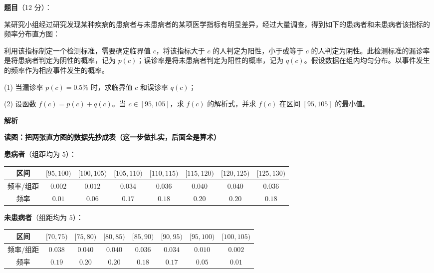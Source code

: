 \begin{answer}

\textbf{题目}（12 分）：

某研究小组经过研究发现某种疾病的患病者与未患病者的某项医学指标有明显差异，经过大量调查，得到如下的患病者和未患病者该指标的频率分布直方图：
\nopagebreak[4]
\begin{center}\end{center}
\nopagebreak[4]
利用该指标制定一个检测标准，需要确定临界值 $c$，将该指标大于 $c$ 的人判定为阳性，小于或等于 $c$ 的人判定为阴性。此检测标准的漏诊率是将患病者判定为阴性的概率，记为 $p(c)$；误诊率是将未患病者判定为阳性的概率，记为 $q(c)$。假设数据在组内均匀分布。以事件发生的频率作为相应事件发生的概率。

  (1) 当漏诊率 $p(c)=0.5\%$ 时，求临界值 $c$ 和误诊率 $q(c)$；

  (2) 设函数 $f(c)=p(c)+q(c)$。当 $c\in[95,105]$，求 $f(c)$ 的解析式，并求 $f(c)$ 在区间 $[95,105]$ 的最小值。

\textbf{解析}

\par\medskip

\textbf{读图：把两张直方图的数据先抄成表（这一步做扎实，后面全是算术）}

\textbf{患病者}（组距均为 $5$）：

\begin{center}
\begingroup\setlength{\tabcolsep}{4pt}
\begin{tabular}{cccccccc}
\toprule
区间 & $[95,100)$ & $[100,105)$ & $[105,110)$ & $[110,115)$ & $[115,120)$ & $[120,125)$ & $[125,130)$ \\
\midrule
频率/组距 & $0.002$ & $0.012$ & $0.034$ & $0.036$ & $0.040$ & $0.040$ & $0.036$ \\
频率 & $0.01$ & $0.06$ & $0.17$ & $0.18$ & $0.20$ & $0.20$ & $0.18$ \\
\bottomrule
\end{tabular}
\endgroup
\end{center}

\textbf{未患病者}（组距均为 $5$）：

\begin{center}
\begingroup\setlength{\tabcolsep}{4pt}
\begin{tabular}{cccccccc}
\toprule
区间 & $[70,75)$ & $[75,80)$ & $[80,85)$ & $[85,90)$ & $[90,95)$ & $[95,100)$ & $[100,105)$ \\
\midrule
频率/组距 & $0.038$ & $0.040$ & $0.040$ & $0.036$ & $0.034$ & $0.010$ & $0.002$ \\
频率 & $0.19$ & $0.20$ & $0.20$ & $0.18$ & $0.17$ & $0.05$ & $0.01$ \\
\bottomrule
\end{tabular}
\endgroup
\end{center}


\end{answer}
